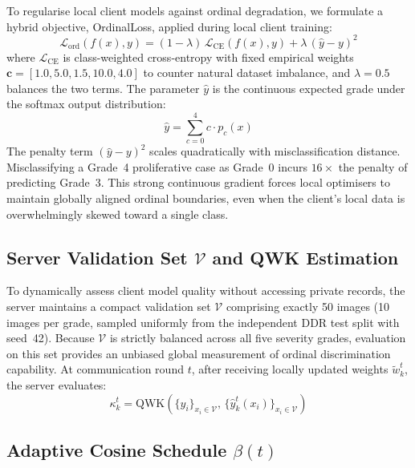 To regularise local client models against ordinal degradation, we formulate a hybrid
objective, OrdinalLoss, applied during local client training:
\begin{equation}
\mathcal{L}_{\text{ord}}(f(x), y) =
  (1 - \lambda)\,\mathcal{L}_{\text{CE}}(f(x), y)
  + \lambda\,(\hat{y} - y)^2
\label{eq:ordloss}
\end{equation}
where $\mathcal{L}_{\text{CE}}$ is class-weighted cross-entropy with fixed empirical
weights $\mathbf{c} = [1.0, 5.0, 1.5, 10.0, 4.0]$ to counter natural dataset imbalance,
and $\lambda = 0.5$ balances the two terms. The parameter $\hat{y}$ is the
continuous expected grade under the softmax output distribution:
\begin{equation}
\hat{y} = \sum_{c=0}^{4} c \cdot p_c(x)
\label{eq:expgrade}
\end{equation}
The penalty term $(\hat{y} - y)^2$ scales quadratically with misclassification
distance. Misclassifying a Grade~4 proliferative case as Grade~0 incurs $16\times$
the penalty of predicting Grade~3. This strong continuous gradient forces local
optimisers to maintain globally aligned ordinal boundaries, even when the client's
local data is overwhelmingly skewed toward a single class.

\subsection{Server Validation Set $\mathcal{V}$ and QWK Estimation}

To dynamically assess client model quality without accessing private records, the
server maintains a compact validation set $\mathcal{V}$ comprising exactly 50 images
(10 images per grade, sampled uniformly from the independent DDR test split with
seed~42). Because $\mathcal{V}$ is strictly balanced across all five severity grades,
evaluation on this set provides an unbiased global measurement of ordinal discrimination
capability. At communication round $t$, after receiving locally updated weights
$\tilde{w}_k^t$, the server evaluates:
\begin{equation}
\kappa_k^t =
\mathrm{QWK}\!\left(\{y_i\}_{x_i \in \mathcal{V}},\,
\{\hat{y}_k^t(x_i)\}_{x_i \in \mathcal{V}}\right)
\label{eq:serverqwk}
\end{equation}

\subsection{Adaptive Cosine Schedule $\beta(t)$}

